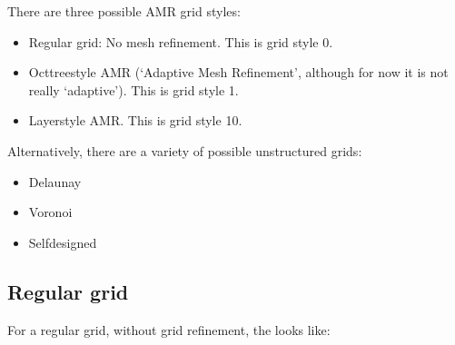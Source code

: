 \documentclass[letterpaper,10pt,english]{sphinxmanual}
\begin{document}
There are three possible AMR grid styles:
\begin{itemize}
\item {} 
Regular grid: No mesh refinement. This is grid style 0.

\item {} 
Oct\sphinxhyphen{}tree\sphinxhyphen{}style AMR (‘Adaptive Mesh Refinement’, although for now it
is not really ‘adaptive’). This is grid style 1.

\item {} 
Layer\sphinxhyphen{}style AMR. This is grid style 10.

\end{itemize}

Alternatively, there are a variety of possible unstructured grids:
\begin{itemize}
\item {} 
Delaunay

\item {} 
Voronoi

\item {} 
Self\sphinxhyphen{}designed

\end{itemize}


\subsection{Regular grid}
\label{\detokenize{inputoutputfiles:regular-grid}}\label{\detokenize{inputoutputfiles:sec-amr-grid-regular}}
For a regular grid, without grid refinement, the  looks like:

\begin{sphinxVerbatim}[commandchars=\\\{\}]
                                      
                                             
              
                      
\PYG{p}{[}\PYG{p}{]}        \PYG{p}{[}\PYG{p}{]}        \PYG{p}{[}\PYG{p}{]}         \PYG{p}{[}\PYG{p}{]}
\PYG{p}{[}\PYG{p}{]}        \PYG{p}{[}\PYG{p}{]}        \PYG{p}{[}\PYG{p}{]}         \PYG{p}{[}\PYG{p}{]}
\PYG{p}{[}\PYG{p}{]}        \PYG{p}{[}\PYG{p}{]}        \PYG{p}{[}\PYG{p}{]}         \PYG{p}{[}\PYG{p}{]}
\end{sphinxVerbatim}
\end{document}
